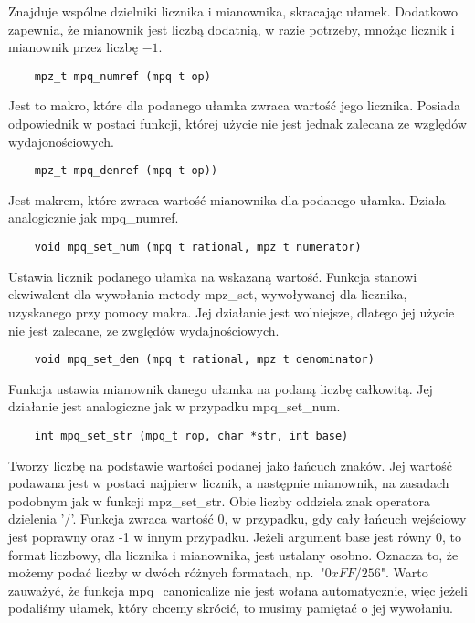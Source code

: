 \documentclass[oneside,a4paper]{book}
\begin{document}
	Znajduje wspólne dzielniki licznika i mianownika, skracając ułamek. Dodatkowo zapewnia, że mianownik jest liczbą dodatnią, w razie potrzeby, mnożąc licznik i mianownik przez liczbę $-1$.
	
	\begin{lstlisting}
	mpz_t mpq_numref (mpq t op)
	\end{lstlisting}
	
	Jest to makro, które dla podanego ułamka zwraca wartość jego licznika. Posiada odpowiednik w postaci funkcji, której użycie nie jest jednak zalecana ze względów wydajonościowych.
	
	\begin{lstlisting}
	mpz_t mpq_denref (mpq t op))
	\end{lstlisting}
	
	Jest makrem, które zwraca wartość mianownika dla podanego ułamka. Działa analogicznie jak mpq\_numref.
	
	\begin{lstlisting}
	void mpq_set_num (mpq t rational, mpz t numerator)
	\end{lstlisting}
	
	Ustawia licznik podanego ułamka na wskazaną wartość. Funkcja stanowi ekwiwalent dla wywołania metody mpz\_set, wywoływanej dla licznika, uzyskanego przy pomocy makra. Jej działanie jest wolniejsze, dlatego jej użycie nie jest zalecane, ze zwględów wydajnościowych.
	
	\begin{lstlisting}
	void mpq_set_den (mpq t rational, mpz t denominator)
	\end{lstlisting}
	Funkcja ustawia mianownik danego ułamka na podaną liczbę całkowitą. Jej działanie jest analogiczne jak w przypadku mpq\_set\_num.
	
	\begin{lstlisting}
	int mpq_set_str (mpq_t rop, char *str, int base)
	\end{lstlisting}
	
	Tworzy liczbę na podstawie wartości podanej jako łańcuch znaków. Jej wartość podawana jest w postaci najpierw licznik, a następnie mianownik, na zasadach podobnym jak w funkcji mpz\_set\_str. Obie liczby oddziela znak operatora dzielenia '/'. Funkcja zwraca wartość $0$, w przypadku, gdy cały łańcuch wejściowy jest poprawny oraz -1 w innym przypadku. Jeżeli argument base jest równy $0$, to format liczbowy, dla licznika i mianownika, jest ustalany osobno. Oznacza to, że możemy podać liczby w dwóch różnych formatach, np.\ "$0xFF/256$". Warto zauważyć, że funkcja mpq\_canonicalize nie jest wołana automatycznie, więc jeżeli podaliśmy ułamek, który chcemy skrócić, to musimy pamiętać o jej wywołaniu.
	
\end{document}
